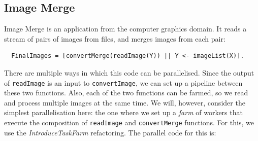 \documentclass[final]{jfp1}
\begin{document}

\subsection{Image Merge}
Image Merge is an application from the computer graphics domain. It reads a
stream of pairs of images from files, and merges images from each
pair:

\begin{lstlisting}
  FinalImages = [convertMerge(readImage(Y)) || Y <- imageList(X)].
\end{lstlisting}

\noindent
There are multiple ways in which this code can be parallelised. Since
the output of \lstinline{readImage} is an input to
\lstinline{convertImage}, we can set up a pipeline between these two
functions. Also, each of the two functions can be farmed, so we read
and process multiple images at the same time. We will, however,
consider the simplest parallelisation here: the one where we set up a
\emph{farm} of workers that execute the composition of \lstinline{readImage} and \lstinline{convertMerge} functions.
For this, we use the \emph{IntroduceTaskFarm} refactoring.
The parallel code for this is:
\end{document}
